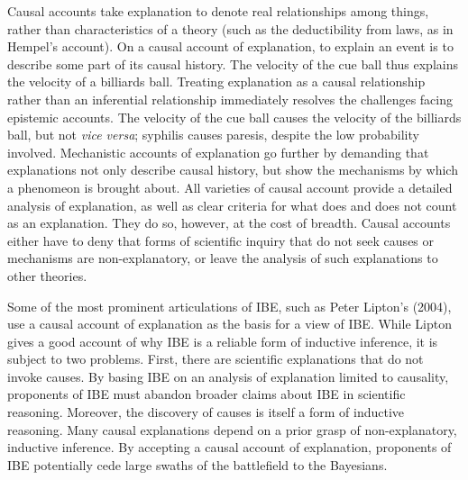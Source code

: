 \documentclass{article}[11pt]
\begin{document}
Causal accounts take explanation to denote real relationships among things, rather than characteristics of a theory (such as the deductibility from laws, as in Hempel's account). On a causal account of explanation, to explain an event is to describe some part of its causal history.  The velocity of the cue ball thus explains the velocity of a billiards ball.  Treating explanation as a causal relationship rather than an inferential relationship immediately resolves the challenges facing epistemic accounts.  The velocity of the cue ball causes the velocity of the billiards ball, but not \textit{vice versa}; syphilis causes paresis, despite the low probability involved. Mechanistic accounts of explanation go further by demanding that explanations not only describe causal history, but show the mechanisms by which a phenomeon is brought about.  All varieties of causal account provide a detailed analysis of explanation, as well as clear criteria for what does and does not count as an explanation.  They do so, however, at the cost of breadth.  Causal accounts either have to deny that forms of scientific inquiry that do not seek causes or mechanisms are non-explanatory, or leave the analysis of such explanations to other theories.


Some of the most prominent articulations of IBE, such as Peter Lipton's (2004), use a causal account of explanation as the basis for a view of IBE.  While Lipton gives a good account of why IBE is a reliable form of inductive inference, it is subject to two problems.  First, there are scientific explanations that do not invoke causes.  By basing IBE on an analysis of explanation limited to causality, proponents of IBE must abandon broader claims about IBE in scientific reasoning.  Moreover, the discovery of causes is itself a form of inductive reasoning. Many causal explanations depend on a prior grasp of non-explanatory, inductive inference.  By accepting a causal account of explanation, proponents of IBE potentially cede large swaths of the battlefield to the Bayesians.    
\end{document}

